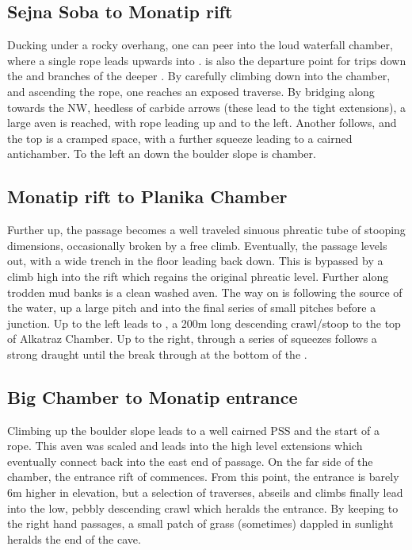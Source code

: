 \subsection{Sejna Soba to Monatip rift}
Ducking under a rocky overhang, one can peer into the loud waterfall chamber, where a single rope leads upwards into .  is also the departure point for trips down the  and  branches of the deeper . By carefully climbing down into the chamber, and ascending the rope, one reaches an exposed traverse. By bridging along towards the NW, heedless of carbide arrows (these lead to the tight  extensions), a large aven is reached, with rope leading up and to the left. Another follows, and the top is a cramped space, with a further squeeze leading to a cairned antichamber. To the left an down the boulder slope is  chamber.

\subsection{Monatip rift to Planika Chamber}
Further up, the passage becomes a well traveled sinuous phreatic tube of stooping dimensions, occasionally broken by a free climb. Eventually, the passage levels out, with a wide trench in the floor leading back down. This is bypassed by a climb high into the rift which regains the original phreatic level. Further along trodden mud banks is a clean washed aven. The way on is following the source of the water, up a large pitch and into the final series of small pitches before a junction. Up to the left leads to , a 200m long descending crawl/stoop to the top of Alkatraz Chamber.  Up to the right, through a series of squeezes follows a strong draught until the break through at the bottom of the  .

\subsection{Big Chamber to Monatip entrance}
Climbing up the boulder slope leads to a well cairned PSS and the start of a rope. This aven was scaled and leads into the high level  extensions which eventually connect back into the east end of  passage.  On the far side of the chamber, the entrance rift of  commences. From this point, the entrance is barely 6m higher in elevation, but a selection of traverses, abseils and climbs finally lead into the low, pebbly descending crawl which heralds the entrance. By keeping to the right hand passages, a small patch of grass (sometimes) dappled in sunlight heralds the end of the cave. 

